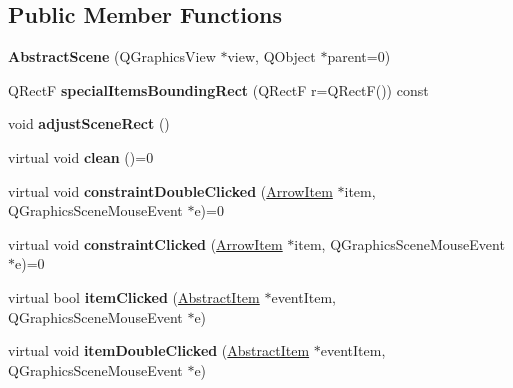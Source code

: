 \subsection*{Public Member Functions}
\begin{DoxyCompactItemize}
\item 
\hypertarget{class_abstract_scene_a203b823d45c41307405a4e19fb669f96}{{\bfseries Abstract\-Scene} (Q\-Graphics\-View $\ast$view, Q\-Object $\ast$parent=0)}\label{class_abstract_scene_a203b823d45c41307405a4e19fb669f96}

\item 
\hypertarget{class_abstract_scene_a845771634a3c73cad140caa538ab9973}{Q\-Rect\-F {\bfseries special\-Items\-Bounding\-Rect} (Q\-Rect\-F r=Q\-Rect\-F()) const }\label{class_abstract_scene_a845771634a3c73cad140caa538ab9973}

\item 
\hypertarget{class_abstract_scene_a2b2341b904e79aad38f22e160e70f9ef}{void {\bfseries adjust\-Scene\-Rect} ()}\label{class_abstract_scene_a2b2341b904e79aad38f22e160e70f9ef}

\item 
\hypertarget{class_abstract_scene_a2c5441d894ead95230733c784953cdfa}{virtual void {\bfseries clean} ()=0}\label{class_abstract_scene_a2c5441d894ead95230733c784953cdfa}

\item 
\hypertarget{class_abstract_scene_a67229b8c6e8c81f64f2cff9b20f4d221}{virtual void {\bfseries constraint\-Double\-Clicked} (\hyperlink{class_arrow_item}{Arrow\-Item} $\ast$item, Q\-Graphics\-Scene\-Mouse\-Event $\ast$e)=0}\label{class_abstract_scene_a67229b8c6e8c81f64f2cff9b20f4d221}

\item 
\hypertarget{class_abstract_scene_a7a3ffbba009c87ad51700e2939dd38fa}{virtual void {\bfseries constraint\-Clicked} (\hyperlink{class_arrow_item}{Arrow\-Item} $\ast$item, Q\-Graphics\-Scene\-Mouse\-Event $\ast$e)=0}\label{class_abstract_scene_a7a3ffbba009c87ad51700e2939dd38fa}

\item 
\hypertarget{class_abstract_scene_a5ede5b83bcb15155923ff94496b31435}{virtual bool {\bfseries item\-Clicked} (\hyperlink{class_abstract_item}{Abstract\-Item} $\ast$event\-Item, Q\-Graphics\-Scene\-Mouse\-Event $\ast$e)}\label{class_abstract_scene_a5ede5b83bcb15155923ff94496b31435}

\item 
\hypertarget{class_abstract_scene_ae83407bcc1b0b01a9c5816b65340fb0a}{virtual void {\bfseries item\-Double\-Clicked} (\hyperlink{class_abstract_item}{Abstract\-Item} $\ast$event\-Item, Q\-Graphics\-Scene\-Mouse\-Event $\ast$e)}\label{class_abstract_scene_ae83407bcc1b0b01a9c5816b65340fb0a}


\end{DoxyCompactItemize}
